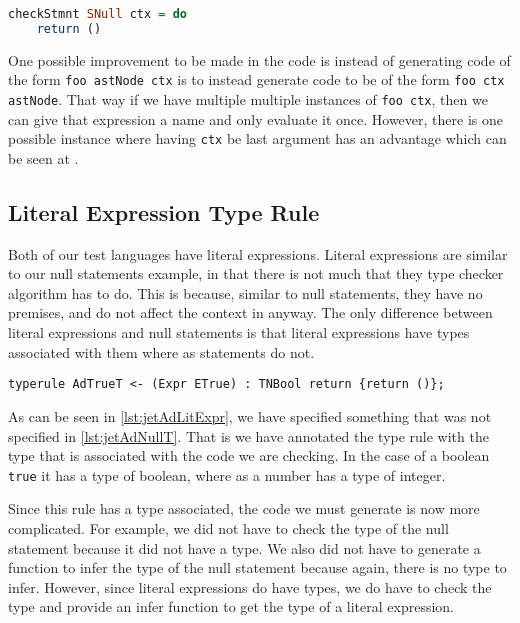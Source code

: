 \begin{lstlisting}[caption = Code generated from AdNullT, label=lst:codeAdNullT, language=Haskell]
checkStmnt SNull ctx = do
    return ()
\end{lstlisting}

One possible improvement to be made in the code is instead of generating code of the form \texttt{foo astNode ctx} is to instead generate code to be of the form \texttt{foo ctx astNode}.
That way if we have multiple multiple instances of \texttt{foo ctx}, then we can give that expression a name and only evaluate it once.
However, there is one possible instance where having \texttt{ctx} be last argument has an advantage which can be seen at .

\subsection{Literal Expression Type Rule}
Both of our test languages have literal expressions.
Literal expressions are similar to our null statements example, in that there is not much that they type checker algorithm has to do.
This is because, similar to null statements, they have no premises, and do not affect the context in anyway.
The only difference between literal expressions and null statements is that literal expressions have types associated with them where as statements do not.

\begin{lstlisting}[caption = JET type rule for simple literal expressions, label=lst:jetAdLitExpr]
typerule AdTrueT <- (Expr ETrue) : TNBool return {return ()};
\end{lstlisting}

As can be seen in \autoref{lst:jetAdLitExpr}, we have specified something that was not specified in \autoref{lst:jetAdNullT}.
That is we have annotated the type rule with the type that is associated with the code we are checking.
In the case of a boolean \texttt{true} it has a type of boolean, where as a number has a type of integer.

Since this rule has a type associated, the code we must generate is now more complicated.
For example, we did not have to check the type of the null statement because it did not have a type.
We also did not have to generate a function to infer the type of the null statement because again, there is no type to infer.
However, since literal expressions do have types, we do have to check the type and provide an infer function to get the type of a literal expression.

